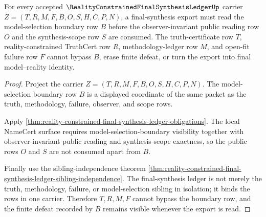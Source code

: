 \begin{theorem}
\label{thm:reality-constrained-final-synthesis-ledger-model-selection-handoff}
For every accepted $\RealityConstrainedFinalSynthesisLedgerUp$ carrier $Z=(T,R,M,F,B,O,S,H,C,P,N)$, a final-synthesis export must read the model-selection boundary row $B$ before the observer-invariant public reading row $O$ and the synthesis-scope row $S$ are consumed. The truth-certificate row $T$, reality-constrained TruthCert row $R$, methodology-ledger row $M$, and open-fit failure row $F$ cannot bypass $B$, erase finite defeat, or turn the export into final model--reality identity.
\end{theorem}
\begin{proof}
Project the carrier $Z=(T,R,M,F,B,O,S,H,C,P,N)$. The model-selection boundary row $B$ is a displayed coordinate of the same packet as the truth, methodology, failure, observer, and scope rows.

Apply \autoref{thm:reality-constrained-final-synthesis-ledger-obligations}. The local NameCert surface requires model-selection-boundary visibility together with observer-invariant public reading and synthesis-scope exactness, so the public rows $O$ and $S$ are not consumed apart from $B$.

Finally use the sibling-independence theorem \autoref{thm:reality-constrained-final-synthesis-ledger-sibling-independence}. The final-synthesis ledger is not merely the truth, methodology, failure, or model-selection sibling in isolation; it binds the rows in one carrier. Therefore $T,R,M,F$ cannot bypass the boundary row, and the finite defeat recorded by $B$ remains visible whenever the export is read.
\end{proof}

